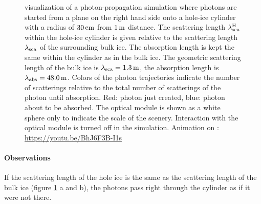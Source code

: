 \begin{figure}[htbp]
  \hfill
  \hfill
  \hfill
  \hfill
  \hfill
  \hfill
  \hfill
  \hfill
  \caption{\steamshovel visualization of a photon-propagation simulation where photons are started from a plane on the right hand side onto a hole-ice cylinder with a radius of $30\text{\,cm}$ from $1\text{\,m}$ distance. The scattering length $\lambda_\text{sca}^\text{H}$ within the hole-ice cylinder is given relative to the scattering length $\lambda_\text{sca}$ of the surrounding bulk ice. The absorption length is kept the same within the cylinder as in the bulk ice. The geometric scattering length of the bulk ice is $\lambda_\text{sca} = 1.3\text{\,m}$, the absorption length is $\lambda_\text{abs} = 48.0\text{\,m}$. Colors of the photon trajectories indicate the number of scatterings relative to the total number of scatterings of the photon until absorption. Red: photon just created, blue: photon about to be absorbed. The optical module is shown as a white sphere only to indicate the scale of the scenery. Interaction with the optical module is turned off in the simulation. Animation on : \protect\url{https://youtu.be/BhJ6F3B-I1s}}
  \label{fig:Uo8kuo2z}
\end{figure}

\paragraph{Observations}

If the scattering length of the hole ice is the same as the scattering
length of the bulk ice (figure \ref{fig:Uo8kuo2z} a and b), the photons
pass right through the cylinder as if it were not there.

